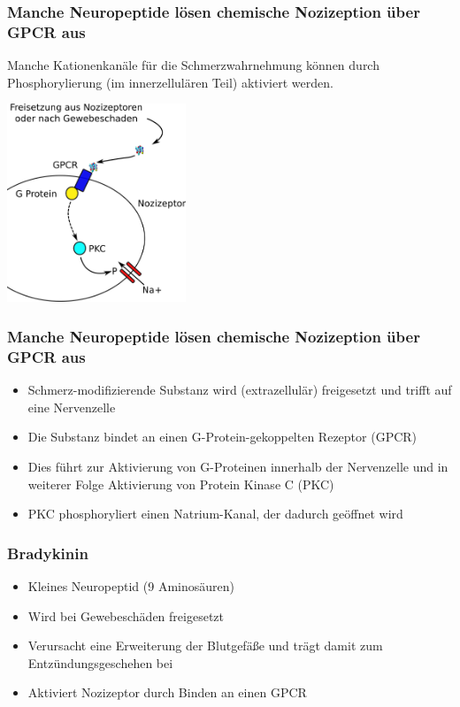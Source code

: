 \documentclass{beamer}
\begin{document}
\begin{frame}
\frametitle{Manche Neuropeptide lösen chemische Nozizeption über GPCR aus}


Manche Kationenkanäle für die Schmerzwahrnehmung können durch Phosphorylierung (im innerzellulären Teil) aktiviert werden. 


\begin{center}
\includegraphics[width=0.4\textwidth]{nozizeptive_neuropeptide.png}
\end{center}



\end{frame}



\begin{frame}
\frametitle{Manche Neuropeptide lösen chemische Nozizeption über GPCR aus}


\begin{itemize}
\item 
Schmerz-modifizierende Substanz wird (extrazellulär) freigesetzt und trifft auf eine Nervenzelle
\item
Die Substanz bindet an einen G-Protein-gekoppelten Rezeptor (GPCR)
\item
Dies führt zur Aktivierung von G-Proteinen innerhalb der Nervenzelle und in weiterer Folge Aktivierung von Protein Kinase C (PKC)
\item
PKC phosphoryliert einen Natrium-Kanal, der dadurch geöffnet wird
\end{itemize}


\end{frame}


\begin{frame}


\frametitle{Bradykinin}

\begin{itemize}
\item
Kleines Neuropeptid (9 Aminosäuren)
\item
Wird bei Gewebeschäden freigesetzt 
\item
Verursacht eine Erweiterung der Blutgefäße und trägt damit zum Entzündungsgeschehen bei
\item
Aktiviert Nozizeptor durch Binden an einen GPCR
\end{itemize}


\end{frame}
\end{document}
